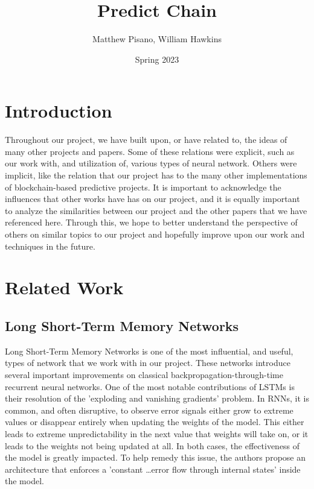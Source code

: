 \documentclass{article}
\title{Predict Chain}
\author{Matthew Pisano, William Hawkins}
\date{Spring 2023}
\begin{document}
    \maketitle

    \section{Introduction}

    Throughout our project, we have built upon, or have related to, the ideas of many other projects and papers.
    Some of these relations were explicit, such as our work with, and utilization of, various types of neural
    network.  Others were implicit, like the relation that our project has to the many other implementations of
    blockchain-based predictive projects.  It is important to acknowledge the influences that other works have
    has on our project, and it is equally important to analyze the similarities between our project and the
    other papers that we have referenced here.  Through this, we hope to better understand the perspective of
    others on similar topics to our project and hopefully improve upon our work and techniques in the future.


    \section{Related Work}

    \subsection{Long Short-Term Memory Networks}

    Long Short-Term Memory Networks\cite{LSTM} is one of the most influential, and useful, types of network that we work
    with in our project.  These networks introduce several important improvements on classical backpropagation-through-time
    recurrent neural networks.  One of the most notable contributions of LSTMs is their resolution of the 'exploding
    and vanishing gradients' problem.  In RNNs, it is common, and often disruptive, to observe error signals either
    grow to extreme values or disappear entirely when updating the weights of the model.  This either leads to
    extreme unpredictability in the next value that weights will take on, or it leads to the weights not being
    updated at all. In both cases, the effectiveness of the model is greatly impacted.  To help remedy this issue,
    the authors propose an architecture that enforces a 'constant \ldots error flow through internal states' inside the
    model.
\end{document}
